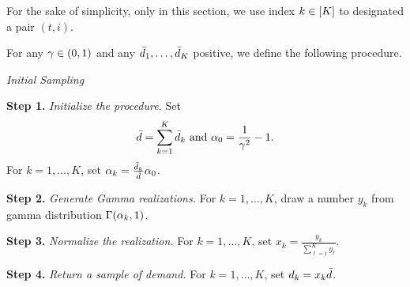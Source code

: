 For the sake of simplicity, only in this section, we use index $k\in\range{K}$ to designated a pair $(t,i)$.


\medskip





For any $\gamma\in\bracket{0,1}$ and any $\bar{d}_1,\ldots,\bar{d}_K$ positive, we define the following procedure.
\begin{proc}\label{proc:demand:initial-sampling}
\emph{Initial Sampling}

\textbf{Step 1.} \emph{Initialize the procedure.}
Set
\begin{equation}
    \bar{\demand} = \sum_{k=1}^K\bar{\demand}_k
    \ \mbox{and}\ 
    \alpha_0 = \frac{1}{\gamma^2}-1.
\end{equation}
For $k=1,\ldots,K$, set $\alpha_k=\frac{\bar{d}_k}{\bar{d}}\alpha_0$.

\textbf{Step 2.} \emph{Generate Gamma realizations.}
For $k=1,\ldots,K$, draw a number $y_k$ from gamma distribution $\Gamma\bracket{\alpha_k,1}$.

\textbf{Step 3.} \emph{Normalize the realization.}
For $k=1,\ldots,K$, set $x_k=\frac{y_k}{\sum_{\ell=1}^K y_{\ell}}$.

\textbf{Step 4.} \emph{Return a sample of demand.}
For $k=1,\ldots,K$, set $d_k = x_k \bar{d}$.
\end{proc}


